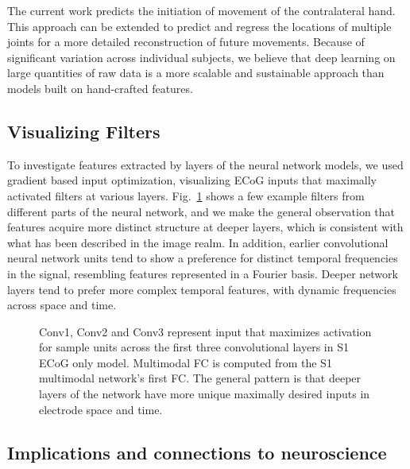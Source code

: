 \documentclass[letterpaper]{article} %
\begin{document}
The current work predicts the initiation of movement of the contralateral hand. This approach can be extended to predict and regress the locations of multiple joints for a more detailed reconstruction of future movements. 
Because of significant variation across individual subjects, we believe that deep learning on large quantities of raw data is a more scalable and sustainable approach than models built on hand-crafted features.


\subsection{Visualizing Filters}

To investigate features extracted by layers of the neural network models, we used gradient based input optimization, visualizing ECoG inputs that maximally activated filters at various layers. 
Fig.~\ref{fig:weights} shows a few example filters from different parts of the neural network, and we make the general observation that features acquire more distinct structure at deeper layers, which is consistent with what has been described in the image realm. 
In addition, earlier convolutional neural network units tend to show a preference for distinct temporal frequencies in the signal, resembling features represented in a Fourier basis. 
Deeper network layers tend to prefer more complex temporal features, with dynamic frequencies across space and time. 

\begin{figure}[t]
\centering
{}
\caption{Conv1, Conv2 and Conv3 represent input that maximizes activation for sample units across the first three convolutional layers in S1 ECoG only model. Multimodal FC is computed from the S1 multimodal network's first FC. The general pattern is that deeper layers of the network have more unique maximally desired inputs in electrode space and time.
}
\label{fig:weights}
\end{figure}

\subsection{Implications and connections to neuroscience} 
\end{document}
